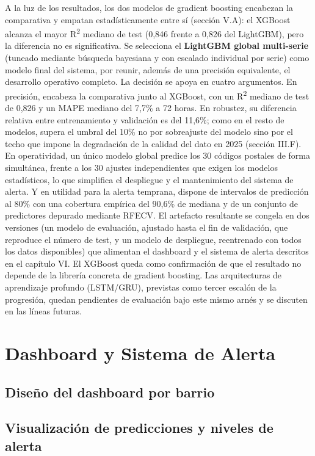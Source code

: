 \documentclass[12pt, a4paper]{article}
\begin{document}
A la luz de los resultados, los dos modelos de gradient boosting encabezan la comparativa y empatan estadísticamente entre sí (sección V.A): el XGBoost alcanza el mayor R\textsuperscript{2} mediano de test (0,846 frente a 0,826 del LightGBM), pero la diferencia no es significativa. Se selecciona el \textbf{LightGBM global multi-serie} (tuneado mediante búsqueda bayesiana y con escalado individual por serie) como modelo final del sistema, por reunir, además de una precisión equivalente, el desarrollo operativo completo. La decisión se apoya en cuatro argumentos. En precisión, encabeza la comparativa junto al XGBoost, con un R\textsuperscript{2} mediano de test de 0,826 y un MAPE mediano del 7,7\% a 72 horas. En robustez, su diferencia relativa entre entrenamiento y validación es del 11,6\%; como en el resto de modelos, supera el umbral del 10\% no por sobreajuste del modelo sino por el techo que impone la degradación de la calidad del dato en 2025 (sección III.F). En operatividad, un único modelo global predice los 30 códigos postales de forma simultánea, frente a los 30 ajustes independientes que exigen los modelos estadísticos, lo que simplifica el despliegue y el mantenimiento del sistema de alerta. Y en utilidad para la alerta temprana, dispone de intervalos de predicción al 80\% con una cobertura empírica del 90,6\% de mediana y de un conjunto de predictores depurado mediante RFECV. El artefacto resultante se congela en dos versiones (un modelo de evaluación, ajustado hasta el fin de validación, que reproduce el número de test, y un modelo de despliegue, reentrenado con todos los datos disponibles) que alimentan el dashboard y el sistema de alerta descritos en el capítulo VI. El XGBoost queda como confirmación de que el resultado no depende de la librería concreta de gradient boosting. Las arquitecturas de aprendizaje profundo (LSTM/GRU), previstas como tercer escalón de la progresión, quedan pendientes de evaluación bajo este mismo arnés y se discuten en las líneas futuras.

\section{Dashboard y Sistema de Alerta}


\subsection{Diseño del dashboard por barrio}


\subsection{Visualización de predicciones y niveles de alerta}
\end{document}
